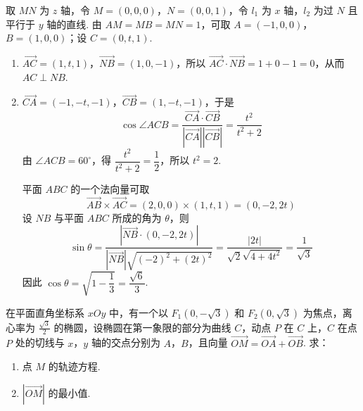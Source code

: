 \begin{solution}
取 \(MN\) 为 \(z\) 轴，令 \(M=(0,0,0)\)，\(N=(0,0,1)\)，令 \(l_1\) 为 \(x\) 轴，\(l_2\) 为过 \(N\) 且平行于 \(y\) 轴的直线. 由 \(AM=MB=MN=1\)，可取 \(A=(-1,0,0)\)，\(B=(1,0,0)\)；设 \(C=(0,t,1)\).

\begin{enumerate}
\item \(\overrightarrow{AC}=(1,t,1)\)，\(\overrightarrow{NB}=(1,0,-1)\)，所以 \(\overrightarrow{AC}\cdot\overrightarrow{NB}=1+0-1=0\)，从而 \(AC\perp NB\).
\item \(\overrightarrow{CA}=(-1,-t,-1)\)，\(\overrightarrow{CB}=(1,-t,-1)\)，于是
\[
\cos\angle ACB=\frac{\overrightarrow{CA}\cdot\overrightarrow{CB}}{|\overrightarrow{CA}||\overrightarrow{CB}|}=\frac{t^2}{t^2+2}
\]
由 \(\angle ACB=60^\circ\)，得 \(\dfrac{t^2}{t^2+2}=\dfrac12\)，所以 \(t^2=2\).

平面 \(ABC\) 的一个法向量可取
\[
\overrightarrow{AB}\times\overrightarrow{AC}=(2,0,0)\times(1,t,1)=(0,-2,2t)
\]
设 \(NB\) 与平面 \(ABC\) 所成的角为 \(\theta\)，则
\[
\sin\theta=\frac{\left|\overrightarrow{NB}\cdot(0,-2,2t)\right|}{|\overrightarrow{NB}|\sqrt{(-2)^2+(2t)^2}}=\frac{|2t|}{\sqrt2\sqrt{4+4t^2}}=\frac1{\sqrt3}
\]
因此 \(\cos\theta=\sqrt{1-\dfrac13}=\dfrac{\sqrt6}{3}\).
\end{enumerate}
\end{solution}

\begin{problem}
在平面直角坐标系 \(xOy\) 中，有一个以 \(F_1(0,-\sqrt3)\) 和 \(F_2(0,\sqrt3)\) 为焦点，离心率为 \(\frac{\sqrt3}{2}\) 的椭圆，设椭圆在第一象限的部分为曲线 \(C\)，动点 \(P\) 在 \(C\) 上，\(C\) 在点 \(P\) 处的切线与 \(x\)，\(y\) 轴的交点分别为 \(A\)，\(B\)，且向量 \(\overrightarrow{OM}=\overrightarrow{OA}+\overrightarrow{OB}\). 求：

\begin{enumerate}
\item 点 \(M\) 的轨迹方程.
\item \(|\overrightarrow{OM}|\) 的最小值.
\end{enumerate}
\end{problem}

